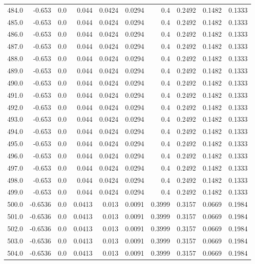\begin{longtable}{lrrrrrrrrr}
484.0 & -0.653 & 0.0 & 0.044 & 0.0424 & 0.0294 & 0.4 & 0.2492 & 0.1482 & 0.1333 \\
485.0 & -0.653 & 0.0 & 0.044 & 0.0424 & 0.0294 & 0.4 & 0.2492 & 0.1482 & 0.1333 \\
486.0 & -0.653 & 0.0 & 0.044 & 0.0424 & 0.0294 & 0.4 & 0.2492 & 0.1482 & 0.1333 \\
487.0 & -0.653 & 0.0 & 0.044 & 0.0424 & 0.0294 & 0.4 & 0.2492 & 0.1482 & 0.1333 \\
488.0 & -0.653 & 0.0 & 0.044 & 0.0424 & 0.0294 & 0.4 & 0.2492 & 0.1482 & 0.1333 \\
489.0 & -0.653 & 0.0 & 0.044 & 0.0424 & 0.0294 & 0.4 & 0.2492 & 0.1482 & 0.1333 \\
490.0 & -0.653 & 0.0 & 0.044 & 0.0424 & 0.0294 & 0.4 & 0.2492 & 0.1482 & 0.1333 \\
491.0 & -0.653 & 0.0 & 0.044 & 0.0424 & 0.0294 & 0.4 & 0.2492 & 0.1482 & 0.1333 \\
492.0 & -0.653 & 0.0 & 0.044 & 0.0424 & 0.0294 & 0.4 & 0.2492 & 0.1482 & 0.1333 \\
493.0 & -0.653 & 0.0 & 0.044 & 0.0424 & 0.0294 & 0.4 & 0.2492 & 0.1482 & 0.1333 \\
494.0 & -0.653 & 0.0 & 0.044 & 0.0424 & 0.0294 & 0.4 & 0.2492 & 0.1482 & 0.1333 \\
495.0 & -0.653 & 0.0 & 0.044 & 0.0424 & 0.0294 & 0.4 & 0.2492 & 0.1482 & 0.1333 \\
496.0 & -0.653 & 0.0 & 0.044 & 0.0424 & 0.0294 & 0.4 & 0.2492 & 0.1482 & 0.1333 \\
497.0 & -0.653 & 0.0 & 0.044 & 0.0424 & 0.0294 & 0.4 & 0.2492 & 0.1482 & 0.1333 \\
498.0 & -0.653 & 0.0 & 0.044 & 0.0424 & 0.0294 & 0.4 & 0.2492 & 0.1482 & 0.1333 \\
499.0 & -0.653 & 0.0 & 0.044 & 0.0424 & 0.0294 & 0.4 & 0.2492 & 0.1482 & 0.1333 \\
500.0 & -0.6536 & 0.0 & 0.0413 & 0.013 & 0.0091 & 0.3999 & 0.3157 & 0.0669 & 0.1984 \\
501.0 & -0.6536 & 0.0 & 0.0413 & 0.013 & 0.0091 & 0.3999 & 0.3157 & 0.0669 & 0.1984 \\
502.0 & -0.6536 & 0.0 & 0.0413 & 0.013 & 0.0091 & 0.3999 & 0.3157 & 0.0669 & 0.1984 \\
503.0 & -0.6536 & 0.0 & 0.0413 & 0.013 & 0.0091 & 0.3999 & 0.3157 & 0.0669 & 0.1984 \\
504.0 & -0.6536 & 0.0 & 0.0413 & 0.013 & 0.0091 & 0.3999 & 0.3157 & 0.0669 & 0.1984 \\

\end{longtable}
